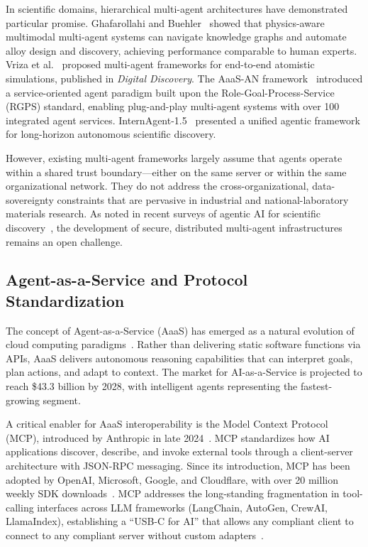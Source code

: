 \documentclass{article}
\begin{document}
In scientific domains, hierarchical multi-agent architectures have demonstrated particular promise. Ghafarollahi and Buehler~\cite{ghafarollahi2024,ghafarollahi2025pnas} showed that physics-aware multimodal multi-agent systems can navigate knowledge graphs and automate alloy design and discovery, achieving performance comparable to human experts. Vriza et al.~\cite{vriza2026} proposed multi-agent frameworks for end-to-end atomistic simulations, published in \textit{Digital Discovery}. The AaaS-AN framework~\cite{aaasan2025} introduced a service-oriented agent paradigm built upon the Role-Goal-Process-Service (RGPS) standard, enabling plug-and-play multi-agent systems with over 100 integrated agent services. InternAgent-1.5~\cite{feng2026internagent} presented a unified agentic framework for long-horizon autonomous scientific discovery.

However, existing multi-agent frameworks largely assume that agents operate within a shared trust boundary---either on the same server or within the same organizational network. They do not address the cross-organizational, data-sovereignty constraints that are pervasive in industrial and national-laboratory materials research. As noted in recent surveys of agentic AI for scientific discovery~\cite{wei2025agentic,gridach2025survey}, the development of secure, distributed multi-agent infrastructures remains an open challenge.

\subsection{Agent-as-a-Service and Protocol Standardization}

The concept of Agent-as-a-Service (AaaS) has emerged as a natural evolution of cloud computing paradigms~\cite{aaasan2025}. Rather than delivering static software functions via APIs, AaaS delivers autonomous reasoning capabilities that can interpret goals, plan actions, and adapt to context. The market for AI-as-a-Service is projected to reach \$43.3 billion by 2028, with intelligent agents representing the fastest-growing segment.

A critical enabler for AaaS interoperability is the Model Context Protocol (MCP), introduced by Anthropic in late 2024~\cite{anthropic2024mcp}. MCP standardizes how AI applications discover, describe, and invoke external tools through a client-server architecture with JSON-RPC messaging. Since its introduction, MCP has been adopted by OpenAI, Microsoft, Google, and Cloudflare, with over 20 million weekly SDK downloads~\cite{hasan2025}. MCP addresses the long-standing fragmentation in tool-calling interfaces across LLM frameworks (LangChain, AutoGen, CrewAI, LlamaIndex), establishing a ``USB-C for AI'' that allows any compliant client to connect to any compliant server without custom adapters~\cite{hou2025}.
\end{document}
